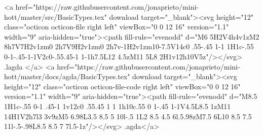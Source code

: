         <a href="https://raw.githubusercontent.com/jonaprieto/mini-hott/master/src/BasicTypes.tex" download target="_blank"><svg height="12" class="octicon octicon-file right left" viewBox="0 0 12 16" version="1.1" width="9" aria-hidden="true"><path fill-rule="evenodd" d="M6 5H2V4h4v1zM2 8h7V7H2v1zm0 2h7V9H2v1zm0 2h7v-1H2v1zm10-7.5V14c0 .55-.45 1-1 1H1c-.55 0-1-.45-1-1V2c0-.55.45-1 1-1h7.5L12 4.5zM11 5L8 2H1v12h10V5z"/></svg> .lagda </a>
        <a href="https://raw.githubusercontent.com/jonaprieto/mini-hott/master/docs/agda/BasicTypes.tex" download target="_blank"><svg height="12" class="octicon octicon-file-code right left" viewBox="0 0 12 16" version="1.1" width="9" aria-hidden="true"><path fill-rule="evenodd" d="M8.5 1H1c-.55 0-1 .45-1 1v12c0 .55.45 1 1 1h10c.55 0 1-.45 1-1V4.5L8.5 1zM11 14H1V2h7l3 3v9zM5 6.98L3.5 8.5 5 10l-.5 1L2 8.5 4.5 6l.5.98zM7.5 6L10 8.5 7.5 11l-.5-.98L8.5 8.5 7 7l.5-1z"/></svg> .agda</a>
      
